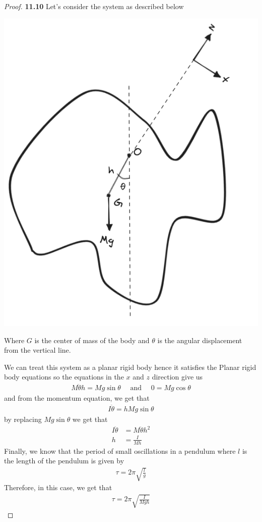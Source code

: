 \documentclass[11pt]{article}
\theoremstyle{definition}
\begin{document}
\begin{proof}{\textbf{11.10}}
    Let's consider the system as described below
    \begin{center}
        \includegraphics[scale=0.5]{ch11-10.png}
    \end{center}
    Where $G$ is the center of mass of the body and $\theta$
    is the angular displacement from the vertical line.

    We can treat this system as a planar rigid body hence it satisfies the
    Planar rigid body equations so the equations in the $x$ and $z$ direction
    give us 
    \begin{align*}
        M \ddot{\theta}h = Mg\sin\theta
        \quad\text{ and }\quad
        0 = Mg\cos\theta
    \end{align*}
    and from the momentum equation, we get that
    \begin{align*}
        I \ddot{\theta} = h Mg\sin\theta
    \end{align*}
    by replacing $Mg\sin\theta$ we get that
    \begin{align*}
        I\ddot{\theta} &= M \ddot{\theta}h^2\\
        h &= \frac{I}{Mh}
    \end{align*}
    Finally, we know that the period of small oscillations in a pendulum where
    $l$ is the length of the pendulum is given by
    \begin{align*}
        \tau = 2\pi \sqrt{\frac{l}{g}}
    \end{align*}
    Therefore, in this case, we get that
    \begin{align*}
        \tau = 2\pi \sqrt{\frac{I}{Mgh}}
    \end{align*}


\end{proof}
\end{document}
